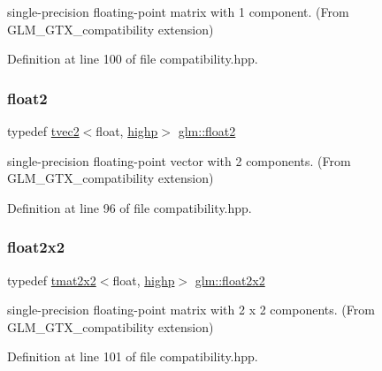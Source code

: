 single-\/precision floating-\/point matrix with 1 component. (From G\+L\+M\+\_\+\+G\+T\+X\+\_\+compatibility extension) 



Definition at line 100 of file compatibility.\+hpp.

\mbox{\label{group__gtx__compatibility_ga3174e387d3b89c5dcff485c4e665a68c}} 
\subsubsection{\texorpdfstring{float2}{float2}}
{\footnotesize\ttfamily typedef \mbox{\hyperlink{structglm_1_1tvec2}{tvec2}}$<$float, \mbox{\hyperlink{namespaceglm_a0f04f086094c747d227af4425893f545ac6f7eab42eacbb10d59a58e95e362074}{highp}}$>$ \mbox{\hyperlink{group__gtx__compatibility_ga3174e387d3b89c5dcff485c4e665a68c}{glm\+::float2}}}



single-\/precision floating-\/point vector with 2 components. (From G\+L\+M\+\_\+\+G\+T\+X\+\_\+compatibility extension) 



Definition at line 96 of file compatibility.\+hpp.

\mbox{\label{group__gtx__compatibility_ga577dc885086d068647175794909bc026}} 
\subsubsection{\texorpdfstring{float2x2}{float2x2}}
{\footnotesize\ttfamily typedef \mbox{\hyperlink{structglm_1_1tmat2x2}{tmat2x2}}$<$float, \mbox{\hyperlink{namespaceglm_a0f04f086094c747d227af4425893f545ac6f7eab42eacbb10d59a58e95e362074}{highp}}$>$ \mbox{\hyperlink{group__gtx__compatibility_ga577dc885086d068647175794909bc026}{glm\+::float2x2}}}



single-\/precision floating-\/point matrix with 2 x 2 components. (From G\+L\+M\+\_\+\+G\+T\+X\+\_\+compatibility extension) 



Definition at line 101 of file compatibility.\+hpp.

